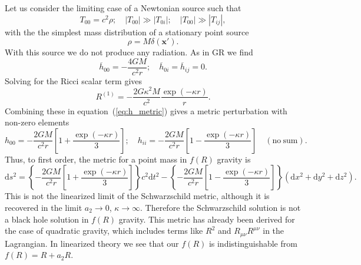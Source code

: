 \documentclass[a4paper, 11pt, titlepage, twoside]{report}
\newcommand{\eqnref}[1]{equation~(\ref{eq:#1})}
\newcommand{\dd}{\ensuremath{\mathrm{d}}}
\begin{document}
Let us consider the limiting case of a Newtonian source such that
\begin{equation}
T_{00} = c^2\rho; \quad |T_{00}| \gg |T_{0i}|; \quad |T_{00}| \gg |T_{ij}|,
\end{equation}
with the the simplest mass distribution of a stationary point source
\begin{equation}
\rho = M\delta(\boldsymbol{x'}).
\end{equation}
With this source we do not produce any radiation. As in GR we find
\begin{equation}
\overline{h}_{00} = -\frac{4GM}{c^2r}; \quad \overline{h}_{0i} = \overline{h}_{ij} = 0.
\end{equation}
Solving for the Ricci scalar term gives
\begin{equation}
R^{(1)} = -\frac{2 G \kappa^2 M}{c^2}\frac{\exp(- \kappa r)}{r}.
\end{equation}
Combining these in \eqnref{h_metric} gives a metric perturbation with non-zero elements 
\begin{equation}
h_{00} = -\frac{2GM}{c^2r}\left[1 + \frac{\exp(- \kappa r)}{3}\right]; \quad h_{ii} = -\frac{2GM}{c^2r}\left[1 - \frac{\exp(- \kappa r)}{3}\right] \quad \mathrm{(no\: sum)}.
\end{equation}
Thus, to first order, the metric for a point mass in $f(R)$ gravity is\cite{Naf2010}
\begin{equation}
\dd s^2 = \left\{-\frac{2GM}{c^2r}\left[1 + \frac{\exp(- \kappa r)}{3}\right]\right\}c^2\dd t^2 - \left\{-\frac{2GM}{c^2r}\left[1 - \frac{\exp(- \kappa r)}{3}\right]\right\}\left(\dd x^2 + \dd y^2 + \dd z^2\right).
\label{eq:f(R)_Schw}
\end{equation}
This is not the linearized limit of the Schwarzschild metric, although it is recovered in the limit $a_2 \rightarrow 0$, $\kappa \rightarrow \infty$. Therefore the Schwarzschild solution is not a black hole solution in $f(R)$ gravity\cite{Chiba2007a}. This metric has already been derived for the case of quadratic gravity, which includes terms like $R^2$ and $R_{\mu\nu}R^{\mu\nu}$ in the Lagrangian\cite{Pechlaner1966, Stelle1978, Schmidt1986, Teyssandier1990}. In linearized theory we see that our $f(R)$ is indistinguishable from $f(R) = R + a_2 R$.
\end{document}
